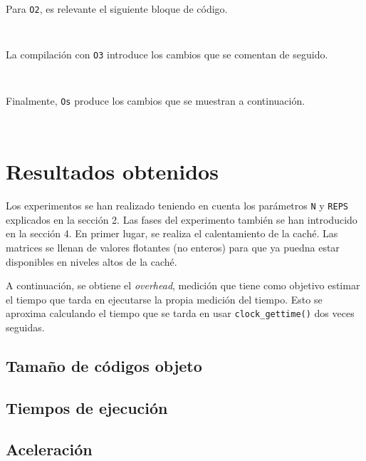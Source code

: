 \documentclass[11pt,a4paper,twoside]{article}
\theoremstyle{definition}
\begin{document}
	Para \texttt{O2}, es relevante el siguiente bloque de código.
	
	\begin{verbatim}
		
	\end{verbatim}

	La compilación con \texttt{O3} introduce los cambios que se comentan de seguido.
	
	\begin{verbatim}
		
	\end{verbatim}
	
	Finalmente, \texttt{Os} produce los cambios que se muestran a continuación.

	\begin{verbatim}
		
	\end{verbatim}
											
	
	\section{Resultados obtenidos}
	
	Los experimentos se han realizado teniendo en cuenta los parámetros \texttt{N} y \texttt{REPS} explicados en la sección 2. Las fases del experimento también se han introducido en la sección 4. En primer lugar, se realiza el calentamiento de la caché. Las matrices se llenan de valores flotantes (no enteros) para que ya puedna estar disponibles en niveles altos de la caché. 
	
	A continuación, se obtiene el \textit{overhead}, medición que tiene como objetivo estimar el tiempo que tarda en ejecutarse la propia medición del tiempo. Esto se aproxima calculando el tiempo que se tarda en usar \texttt{clock\_gettime()} dos veces seguidas.
	
	\subsection{Tamaño de códigos objeto}
	
	\subsection{Tiempos de ejecución}
	
	\subsection{Aceleración}
	
\end{document}
